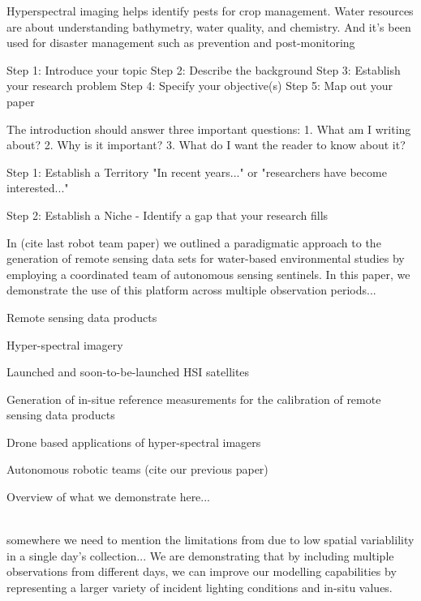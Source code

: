 \documentclass[journal,article,submit,pdftex,moreauthors]{Definitions/mdpi}
\begin{document}
Hyperspectral imaging helps identify pests for crop management. Water resources are about understanding bathymetry, water quality, and chemistry. And it’s been used for disaster management such as prevention and post-monitoring


Step 1: Introduce your topic
Step 2: Describe the background
Step 3: Establish your research problem
Step 4: Specify your objective(s)
Step 5: Map out your paper


The introduction should answer three important questions:
1. What am I writing about?
2. Why is it important?
3. What do I want the reader to know about it?

Step 1: Establish a Territory
"In recent years..." or "researchers have become interested..." 

Step 2: Establish a Niche
- Identify a gap that your research fills 



In (cite last robot team paper) we outlined a paradigmatic approach to the generation of remote sensing data sets for water-based environmental studies by employing a coordinated team of autonomous sensing sentinels. In this paper, we demonstrate the use of this platform across multiple observation periods...



Remote sensing data products 

Hyper-spectral imagery

Launched and soon-to-be-launched HSI satellites 

Generation of in-situe reference measurements for the calibration of remote sensing data products 

Drone based applications of hyper-spectral imagers

Autonomous robotic teams (cite our previous paper) 

Overview of what we demonstrate here...

\\


somewhere we need to mention the limitations from \cite{robotTeam1} due to low spatial variablility in a single day's collection... We are demonstrating that by including multiple observations from different days, we can improve our modelling capabilities by representing a larger variety of incident lighting conditions and in-situ values.
\end{document}
